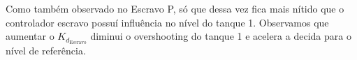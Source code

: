 Como também observado no Escravo P, só que dessa vez fica mais nítido que o controlador escravo possuí influência no nível do tanque 1. Observamos que
aumentar o  $K_{d_{\textrm{Escravo}}}$ diminui o overshooting do tanque 1 e acelera a decida para o nível de referência.